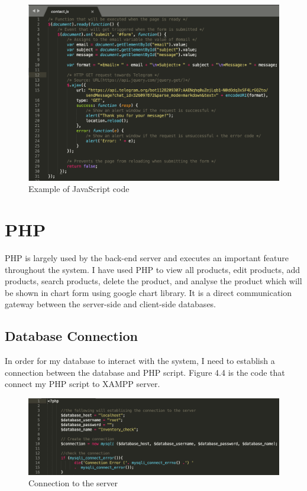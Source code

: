 \begin{figure}[H]
\centering
    \includegraphics[scale=0.5]
    {implement_image/javascript.png}
    \caption{Example of JavaScript code}
    \label{fig:Example of JavaScript code}
\end{figure}

\section{PHP}
PHP is largely used by the back-end server and executes an important feature throughout the system. I have used PHP to view all products, edit products, add products, search products, delete the product, and analyse the product which will be shown in chart form using google chart library. It is a direct communication gateway between the server-side and client-side databases.

\subsection{Database Connection}
In order for my database to interact with the system, I need to establish a connection between the database and PHP script. Figure 4.4 is the code that connect my PHP script to XAMPP server.
\begin{figure}[H]
\centering
    \includegraphics[scale=0.48]
    {implement_image/databaseconnection.png}
    \caption{ Connection to the server}
    \label{fig:Connection to the server}
\end{figure}

